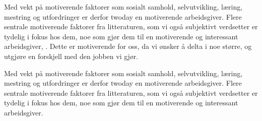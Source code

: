 Med vekt på motiverende faktorer som sosialt samhold, selvutvikling, læring, mestring og utfordringer er derfor
twoday en motiverende arbeidsgiver. Flere sentrale motiverende faktorer fra litteraturen, som vi også subjektivt verdsetter
er tydelig i fokus hos dem, noe som gjør dem til en motiverende og interessant arbeidsgiver, \parencite["Graduateprogrammet"]{Twoday.no}. Dette er motiverende for oss, da vi ønsker å delta i noe
større, og utgjøre en forskjell med den jobben vi gjør.

Med vekt på motiverende faktorer som sosialt samhold, selvutvikling, læring, mestring og utfordringer er derfor
twoday en motiverende arbeidsgiver. Flere sentrale motiverende faktorer fra litteraturen, som vi også subjektivt verdsetter
er tydelig i fokus hos dem, noe som gjør dem til en motiverende og interessant arbeidsgiver. 



